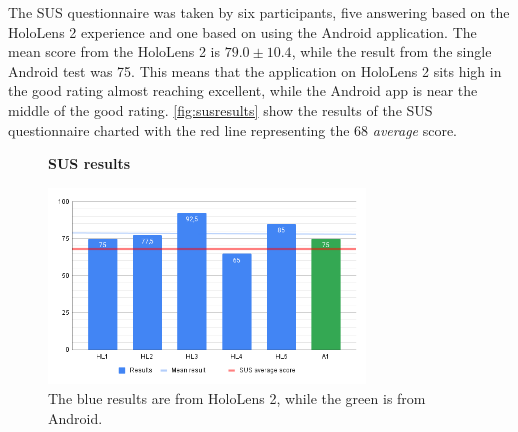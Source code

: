 The SUS questionnaire was taken by six participants, five answering based on the HoloLens 2 experience and one based on using the Android application. The mean score from the HoloLens 2 is $79.0 \pm 10.4$, while the result from the single Android test was 75. This means that the application on HoloLens 2 sits high in the good rating almost reaching excellent, while the Android app is near the middle of the good rating. \autoref{fig:susresults} show the results of the SUS questionnaire charted with the red line representing the 68 \textit{average} score.

\begin{figure}
    \centering
    \textbf{SUS results}\par\medskip
    \includegraphics[width=0.75\textwidth]{fig/susbarchart}
    \caption{The blue results are from HoloLens 2, while the green is from Android.}
    \label{fig:susresults}
\end{figure}


